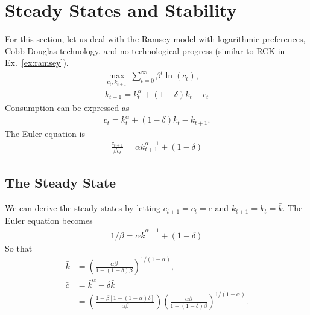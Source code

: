 \documentclass[11pt,a4paper]{book}
\theoremstyle{definition}\newtheorem{definition}{Definition}
\theoremstyle{definition}\newtheorem{fact}{Fact}
\theoremstyle{definition}\newtheorem{remark}{Remark}
\theoremstyle{definition}\newtheorem{ex}{Ex.}
\theoremstyle{definition}\newtheorem{project}{Project}
\theoremstyle{definition}\newtheorem{problem}{Problem}
\theoremstyle{definition}\newtheorem{example}{Example}
\numberwithin{theorem}{section}
\numberwithin{corollary}{chapter}
\numberwithin{assumption}{chapter}
\numberwithin{definition}{chapter}
\numberwithin{prop}{chapter}
\numberwithin{notation}{chapter}
\numberwithin{problem}{chapter}
\numberwithin{example}{chapter}
\numberwithin{fact}{chapter}
\numberwithin{ex}{chapter}
\begin{document}
		\section{Steady States and Stability}
	For this section, let us deal with the Ramsey model with logarithmic preferences, Cobb-Douglas technology, and no technological progress (similar to RCK in Ex.~\ref{ex:ramsey}). 
	\begin{align}
		\max_{c_t, k_{t+1}} \ \sum^{\infty}_{t=0} \beta^t \ln(c_t), \\
		k_{t+1} = k_t^\alpha + (1-\delta)k_t - c_t 
	\end{align}
	Consumption can be expressed as
	\begin{align}
		c_t = k_t^\alpha + (1-\delta)k_t - k_{t+1}. \label{eq:key_cons}
	\end{align}
	The Euler equation is
	\begin{align}
		\frac{c_{t+1}}{\beta c_t} = \alpha k_{t+1}^{\alpha-1} + (1-\delta)  \label{eq:euler2}
	\end{align}
	\subsection{The Steady State}
	We can derive the steady states by letting $c_{t+1} = c_t = \bar{c}$ and $k_{t+1} = k_t = \bar{k}$. The Euler equation becomes
	\begin{align*}
		1/\beta = \alpha \bar{k}^{\alpha-1} + (1-\delta)
	\end{align*}
	So that
	\begin{align}
		\label{eq:k_eqm} \bar{k} &= \left( \frac{\alpha\beta}{1-(1-\delta)\beta} \right)^{1/(1-\alpha)}, \\
		\label{eq:c_eqm} \bar{c} &= \bar{k}^\alpha - \delta\bar{k} \\
		&= \left(\frac{1 - \beta[1-(1-\alpha)\delta]}{\alpha\beta}\right) \left( \frac{\alpha\beta}{1-(1-\delta)\beta} \right)^{1/(1-\alpha)}. \nonumber
	\end{align}
	
\end{document}
